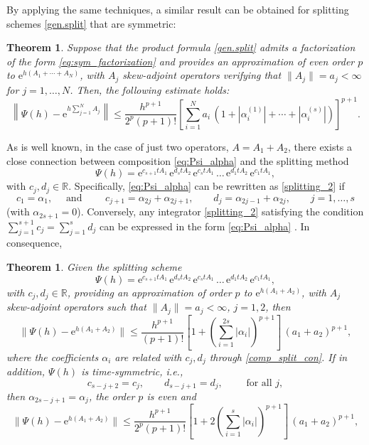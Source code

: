 \documentclass[11pt]{article}
\newcommand{\e}{\ensuremath{\mathrm{e}}}
\newtheorem{theorem}[lemma]{Theorem}
\begin{document}
By applying the same techniques, a similar result can be obtained for splitting schemes \eqref{gen.split} that are symmetric:
\begin{theorem} 
\label{th_gen.split_sym}
Suppose that the product formula \eqref{gen.split} admits a factorization of the form \eqref{eq:sym_factorization}
and provides an approximation of even order $p$ to $\e^{h(A_1 + \cdots + A_N)}$,
with $A_j$ skew-adjoint operators verifying that $\|A_j\| =  a_j < \infty$ for $j=1,\ldots, N$. Then, the following estimate holds:
\begin{equation*}
  \left\|\Psi(h)-\e^{h \sum_{j=1}^N A_j} \right\| \leq \frac{h^{p+1}}{2^p (p+1)!} \left[ \sum_{i=1}^N a_i \, \left(1+|\alpha_i^{(1)}|+\cdots+|\alpha_i^{(s)}|\right)\right]^{p+1}.
  \end{equation*}
\end{theorem}
As is well known, in the case of just two operators, $A = A_1 + A_2$, there exists a  close connection between composition \eqref{eq:Psi_alpha}  
and the splitting method
\begin{equation} \label{splitting_2}
  \Psi(h) = \e^{c_{s+1} t A_1}  \, \e^{d_s t A_2} \, \e^{c_s t A_1} \, \ldots \, \e^{d_1 t A_2} \, \e^{c_1 t A_1}, 
\end{equation}
with $c_j, d_j \in \mathbb{R}$. Specifically, \eqref{eq:Psi_alpha} can be rewritten as \eqref{splitting_2} if 
\begin{equation} \label{comp_split_con}
c_1 = \alpha_1, \quad \mbox{ and } \qquad c_{j+1} = \alpha_{2j} + \alpha_{2j+1}, \qquad d_{j} = \alpha_{2j-1} + \alpha_{2j}, \qquad j=1,\ldots,s
\end{equation}
(with $\alpha_{2s+1} = 0$). Conversely, any integrator \eqref{splitting_2} satisfying the condition $\sum_{j=1}^{s+1} c_j = \sum_{j=1}^s d_j$ can be expressed 
in the form \eqref{eq:Psi_alpha} \cite{mclachlan95otn}. In consequence, 
\begin{theorem} \label{th_split_2}
Given the splitting scheme
\[
  \Psi(h) = \e^{c_{s+1} t A_1}  \, \e^{d_s t A_2} \, \e^{c_s t A_1} \, \ldots \, \e^{d_1 t A_2} \, \e^{c_1 t A_1}, 
\]  
with $c_j, d_j \in \mathbb{R}$, providing an approximation of order $p$ to $\e^{h(A_1+A_2)}$, with $A_j$ skew-adjoint operators such that 
$\|A_j\| = a_j < \infty$, $j=1,2$, then
\[
  \| \Psi(h)  - \e^{h(A_1+A_2)} \| \le \frac{h^{p+1}}{(p+1)!} \left[ 1 +  \left( \sum_{i=1}^{2s} |\alpha_i| \right)^{p+1} \right] \, (a_1 + a_2)^{p+1},
\] 
where the coefficients $\alpha_i$ are related with $c_j, d_j$ through \eqref{comp_split_con}. If in addition, $\Psi(h)$ is time-symmetric, i.e., 
\[
  c_{s-j+2} = c_j, \qquad d_{s-j+1} = d_j, \qquad \mbox{ for all } j,
\]
then $\alpha_{2s-j+1} = \alpha_j$, the order $p$ is even and   
\[
  \| \Psi(h)  - \e^{h(A_1+A_2)} \| \le \frac{h^{p+1}}{2^p (p+1)!} \left[ 1 +  2 \left( \sum_{i=1}^{s} |\alpha_i| \right)^{p+1} \right] \, (a_1 + a_2)^{p+1},
\] 
\end{theorem}
\end{document}
